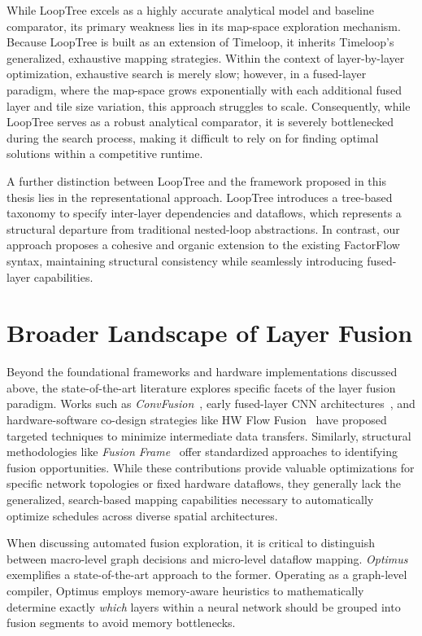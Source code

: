 While LoopTree excels as a highly accurate analytical model and baseline comparator, its primary weakness lies in its map-space exploration mechanism. Because LoopTree is built as an extension of Timeloop, it inherits Timeloop's generalized, exhaustive mapping strategies. Within the context of layer-by-layer optimization, exhaustive search is merely slow; however, in a fused-layer paradigm, where the map-space grows exponentially with each additional fused layer and tile size variation, this approach struggles to scale. Consequently, while LoopTree serves as a robust analytical comparator, it is severely bottlenecked during the search process, making it difficult to rely on for finding optimal solutions within a competitive runtime.

A further distinction between LoopTree and the framework proposed in this thesis lies in the representational approach. LoopTree introduces a tree-based taxonomy to specify inter-layer dependencies and dataflows, which represents a structural departure from traditional nested-loop abstractions. In contrast, our approach proposes a cohesive and organic extension to the existing FactorFlow syntax, maintaining structural consistency while seamlessly introducing fused-layer capabilities.


\section{Broader Landscape of Layer Fusion}

Beyond the foundational frameworks and hardware implementations discussed above, the state-of-the-art literature explores specific facets of the layer fusion paradigm. Works such as \emph{ConvFusion}~\cite{waeijen2021convfusion}, early fused-layer CNN architectures~\cite{alwani2016fusedlayer}, and hardware-software co-design strategies like HW Flow Fusion~\cite{hwflow} have proposed targeted techniques to minimize intermediate data transfers. Similarly, structural methodologies like \emph{Fusion Frame}~\cite{fusionframe} offer standardized approaches to identifying fusion opportunities. While these contributions provide valuable optimizations for specific network topologies or fixed hardware dataflows, they generally lack the generalized, search-based mapping capabilities necessary to automatically optimize schedules across diverse spatial architectures. 

When discussing automated fusion exploration, it is critical to distinguish between macro-level graph decisions and micro-level dataflow mapping. \emph{Optimus}~\cite{optimus} exemplifies a state-of-the-art approach to the former. Operating as a graph-level compiler, Optimus employs memory-aware heuristics to mathematically determine exactly \emph{which} layers within a neural network should be grouped into fusion segments to avoid memory bottlenecks. 

